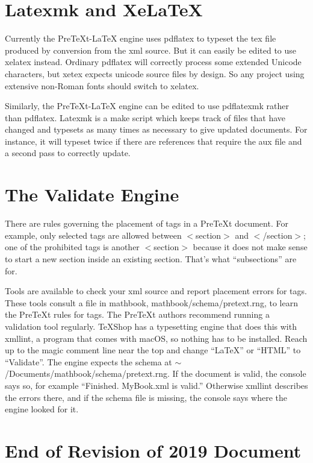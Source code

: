 \documentclass[11pt, oneside]{article}   	%
\begin{document}
\section{Latexmk and XeLaTeX} 

Currently the PreTeXt-LaTeX engine uses pdflatex to typeset the tex file produced by conversion from the xml source. But it can easily be edited to use xelatex instead. Ordinary pdflatex will correctly process some extended Unicode characters, but xetex expects unicode source files by design. So any project using extensive non-Roman fonts should switch to xelatex.

Similarly, the PreTeXt-LaTeX engine can be edited to use pdflatexmk rather than pdflatex. Latexmk is a make script which keeps track of files that have changed and typesets as many times as necessary to give updated documents. For instance, it will typeset twice if there are references that require the aux file and a second pass to correctly update. 

\section{\label{validate}The Validate Engine}

There are  rules governing the placement of tags in a PreTeXt document. For example, only selected tags are allowed between $<$section$>$ and $<$/section$>$; one of the prohibited tags is another $<$section$>$ because it does not make sense to start a new section inside an existing section. That's what ``subsections'' are for.

Tools are available to check your xml source and report placement errors for tags. These tools consult a file in mathbook, mathbook/schema/pretext.rng, to learn the PreTeXt rules for tags. The PreTeXt authors recommend running a validation tool regularly. TeXShop has a typesetting engine that does this with xmllint, a program that comes with macOS, so nothing has to be installed. Reach up to the magic comment line near the top and change ``LaTeX'' or ``HTML'' to ``Validate''. The engine expects the schema at $\sim$/Documents/mathbook/schema/pretext.rng. If the document is valid, the console says so, for example ``Finished. MyBook.xml is valid.'' Otherwise xmllint describes the errors there, and if the schema file is missing, the console says where the engine looked for it.

\section{End of Revision of 2019 Document}
\end{document}
